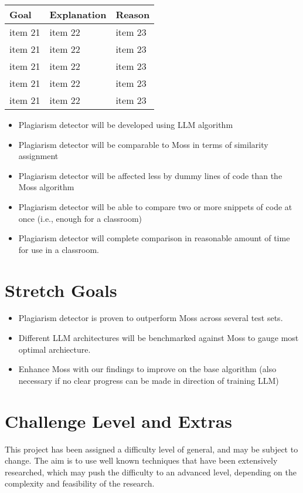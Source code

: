 \documentclass{article}
\begin{document}
\begin{tabularx}{1\textwidth} { 
  | >{\raggedright\arraybackslash}X 
  | >{\raggedright\arraybackslash}X 
  | >{\raggedright\arraybackslash}X | }
 \hline
Goal & 
Explanation & 
Reason \\
 \hline
 item 21  & 
 item 22  & 
 item 23  \\
 \hline
 item 21  & 
 item 22  & 
 item 23  \\
 \hline
 item 21  & 
 item 22  & 
 item 23  \\
 \hline
 item 21  & 
 item 22  & 
 item 23  \\
 \hline
 item 21  & 
 item 22  & 
 item 23  \\
\hline
\end{tabularx}
\begin{itemize}
    \item Plagiarism detector will be developed using LLM algorithm
    \item Plagiarism detector will be comparable to Moss in terms of similarity assignment
    \item Plagiarism detector will be affected less by dummy lines of code than the Moss algorithm
    \item Plagiarism detector will be able to compare two or more snippets of code at once (i.e., enough for a classroom)
    \item Plagiarism detector will complete comparison in reasonable amount of time for use in a classroom.
  \end{itemize}
 
\section{Stretch Goals}
\begin{itemize}
  \item Plagiarism detector is proven to outperform Moss across several test sets.
  \item Different LLM architectures will be benchmarked against Moss to gauge most optimal archiecture.
  \item Enhance Moss with our findings to improve on the base algorithm (also necessary if no clear progress can be made in direction of training LLM)
  
\end{itemize}

\section{Challenge Level and Extras}
This project has been assigned a difficulty level of general, and may be subject to change. The aim is to use well known techniques that have been extensively researched, which may push the difficulty to an advanced level, depending on the complexity and feasibility of the research. 
\end{document}
